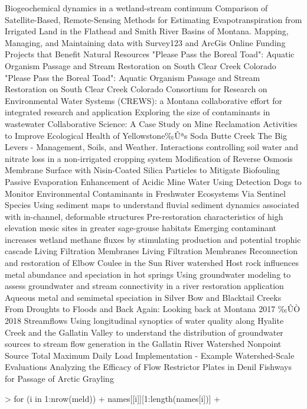 \documentclass[a4paper]{article}
\begin{document}
\begin{center}
\begin{Schunk}
\begin{Soutput}
Biogeochemical dynamics in a wetland-stream continuum 
Comparison of  Satellite-Based,  Remote-Sensing Methods for Estimating Evapotranspiration from Irrigated Land in the Flathead and Smith River Basins of Montana. 
Mapping, Managing, and Maintaining data with Survey123 and ArcGis Online 
Funding Projects that Benefit Natural Resources 
"Please Pass the Boreal Toad": Aquatic Organism Passage and Stream Restoration on South Clear Creek Colorado 
"Please Pass the Boreal Toad": Aquatic Organism Passage and Stream Restoration on South Clear Creek Colorado 
Consortium for Research on Environmental Water Systems (CREWS): a Montana collaborative effort for integrated research and application 
Exploring the size of contaminants in wastewater 
Collaborative Science: A Case Study on Mine Reclamation Activities to Improve Ecological Health of Yellowstone‰Ûªs Soda Butte Creek 
The Big Levers - Management, Soils, and Weather. Interactions controlling soil water and nitrate loss in a non-irrigated cropping system 
Modification of Reverse Osmosis Membrane Surface with Nisin-Coated Silica Particles to Mitigate Biofouling 
Passive Evaporation Enhancement of Acidic Mine Water 
Using Detection Dogs to Monitor Environmental Contaminants in Freshwater Ecosystems Via Sentinel Species 
Using sediment maps to understand fluvial sediment dynamics associated with in-channel, deformable structures 
Pre-restoration characteristics of high elevation mesic sites in greater sage-grouse habitats 
Emerging contaminant increases wetland methane fluxes by stimulating production and potential trophic cascade 
Living Filtration Membranes 
Living Filtration Membranes 
Reconnection and restoration of Elbow Coulee in the Sun River watershed 
Host rock influences metal abundance and speciation in hot springs 
Using groundwater modeling to assess groundwater and stream connectivity in a river restoration application 
Aqueous metal and semimetal speciation in Silver Bow and Blacktail Creeks 
From Droughts to Floods and Back Again: Looking back at Montana 2017 ‰ÛÒ 2018 Streamflows 
Using longitudinal synoptics of water quality along Hyalite Creek and the Gallatin Valley to understand the distribution of groundwater sources to stream flow generation in the Gallatin River Watershed 
Nonpoint Source Total Maximum Daily Load Implementation  - Example Watershed-Scale Evaluations 
Analyzing the Efficacy of Flow Restrictor Plates in Denil Fishways for Passage of Arctic Grayling 
\end{Soutput}
\end{Schunk}


\hspace{10pt}
\large
\begin{Schunk}
\begin{Sinput}
> for (i in 1:nrow(meld)){
+ names[[i]][1:length(names[i])]
+ }
\end{Sinput}
\end{Schunk}

\hspace{10pt}
\end{center}
\end{document}
